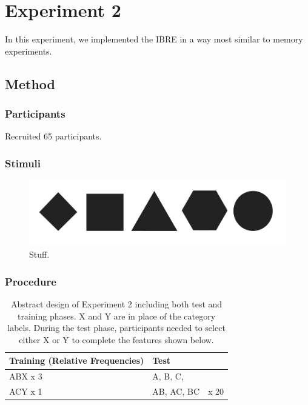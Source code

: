 \documentclass[10pt,letterpaper]{article}
\begin{document}
\section{Experiment 2}

In this experiment, we implemented the IBRE in a way most similar to memory experiments.

\subsection{Method}

\subsubsection*{Participants}

Recruited 65 participants.

\subsubsection*{Stimuli}

\begin{figure}
  \begin{center}
    \caption{Stuff.}
    \label{figure:exp2-stimuli}
    \includegraphics[scale=0.15]{figures/experiment_2_stimuli.pdf}
  \end{center}
\end{figure}

\subsubsection*{Procedure}

\begin{table}[!ht]
  \begin{center}
    \caption{Abstract design of Experiment 2 including both test and training phases. X and Y are in place of the category labels. During the test phase, participants needed to select either X or Y to complete the features shown below.\\}
    \label{tab:abstract-exp2}
    \begin{tabular}{llr} %
      \textbf{Training (Relative Frequencies)} & \textbf{Test}& \\
      \hline
      ABX x 3 &  A, B, C,         &  \\
      ACY x 1 &  AB, AC, BC      & x 20 \\
      \hline
    \end{tabular}
  \end{center}
\end{table}
\end{document}

